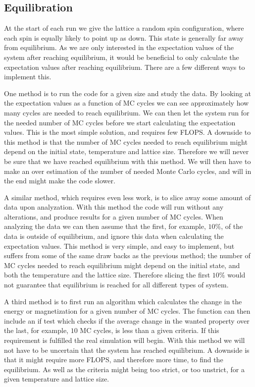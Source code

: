 \documentclass[%
 reprint,
nofootinbib,
aps,
]{revtex4-1}
\begin{document}
\subsection{Equilibration}

At the start of each run we give the lattice a random spin configuration, where each spin is equally likely to point up as down. This state is generally far away from equilibrium. As we are only interested in the expectation values of the system after reaching equilibrium, it would be beneficial to only calculate the expectation values after reaching equilibrium. There are a few different ways to implement this.\par
One method is to run the code for a given size and study the data. By looking at the expectation values as a function of MC cycles we can see approximately how many cycles are needed to reach equilibrium. We can then let the system run for the needed number of MC cycles before we start calculating the expectation values. This is the most simple solution, and requires few FLOPS. A downside to this method is that the number of MC cycles needed to reach equilibrium might depend on the initial state, temperature and lattice size. Therefore we will never be sure that we have reached equilibrium with this method. We will then have to make an over estimation of the number of needed Monte Carlo cycles, and will in the end might make the code slower.\par
\par A similar method, which requires even less work, is to slice away some amount of data upon analyzation. With this method the code will run without any alterations, and produce results for a given number of MC cycles. When analyzing the data we can then assume that the first, for example, $10\%$, of the data is outside of equilibrium, and ignore this data when calculating the expectation values. This method is very simple, and easy to implement, but suffers from some of the same draw backs as the previous method; the number of MC cycles needed to reach equilibrium might depend on the initial state, and both the temperature and the lattice size. Therefore slicing the first $10\%$ would not guarantee that equilibrium is reached for all different types of system.\par
A third method is to first run an algorithm which calculates the change in the energy or magnetization for a given number of MC cycles. The function can then include an if test which checks if the average change in the wanted property over the last, for example, $10$ MC cycles, is less than a given criteria. If this requirement is fulfilled the real simulation will begin. With this method we will not have to be uncertain that the system has reached equilibrium. A downside is that it might require more FLOPS, and therefore more time, to find the equilibrium. As well as the criteria might being too strict, or too unstrict, for a given temperature and lattice size.\par
\end{document}
